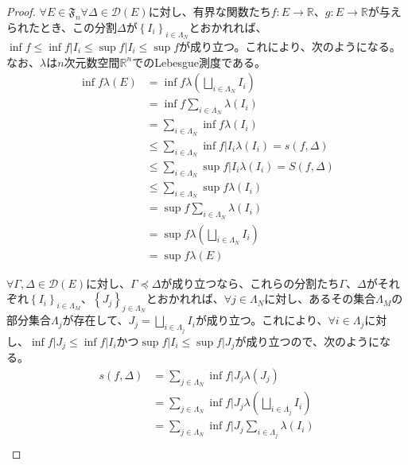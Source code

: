 \documentclass[dvipdfmx]{jsarticle}
\begin{document}
\begin{proof}
$\forall E \in \mathfrak{F}_{n}\forall\varDelta \in \mathcal{D}(E)$に対し、有界な関数たち$f:E \rightarrow \mathbb{R}$、$g:E \rightarrow \mathbb{R}$が与えられたとき、この分割$\varDelta$が$\left\{ I_{i} \right\}_{i \in \varLambda_{N}}$とおかれれば、$\inf f \leq \inf{f|I_{i}} \leq \sup{f|I_{i}} \leq \sup f$が成り立つ。これにより、次のようになる。なお、$\lambda$は$n$次元数空間$\mathbb{R}^{n}$でのLebesgue測度である。
\begin{align*}
\inf f\lambda(E) &= \inf f\lambda\left( \bigsqcup_{i \in \varLambda_{N}} I_{i} \right)\\
&= \inf f\sum_{i \in \varLambda_{N}} {\lambda\left( I_{i} \right)}\\
&= \sum_{i \in \varLambda_{N}} {\inf f\lambda\left( I_{i} \right)}\\
&\leq \sum_{i \in \varLambda_{N}} {\inf{f|I_{i}}\lambda\left( I_{i} \right)} = s(f,\varDelta)\\
&\leq \sum_{i \in \varLambda_{N}} {\sup{f|I_{i}}\lambda\left( I_{i} \right)} = S(f,\varDelta)\\
&\leq \sum_{i \in \varLambda_{N}} {\sup f\lambda\left( I_{i} \right)}\\
&= \sup f\sum_{i \in \varLambda_{N}} {\lambda\left( I_{i} \right)}\\
&= \sup f\lambda\left( \bigsqcup_{i \in \varLambda_{N}} I_{i} \right)\\
&= \sup f\lambda(E)
\end{align*}\par
$\forall\varGamma,\varDelta \in \mathcal{D}(E)$に対し、$\varGamma \preccurlyeq \varDelta$が成り立つなら、これらの分割たち$\varGamma$、$\varDelta$がそれぞれ$\left\{ I_{i} \right\}_{i \in \varLambda_{M}}$、$\left\{ J_{j} \right\}_{j \in \varLambda_{N}}$とおかれれば、$\forall j \in \varLambda_{N}$に対し、あるその集合$\varLambda_{M}$の部分集合$\varLambda_{j}$が存在して、$J_{j} = \bigsqcup_{i \in \varLambda_{j}} I_{i}$が成り立つ。これにより、$\forall i \in \varLambda_{j}$に対し、$\inf{f|J_{j}} \leq \inf{f|I_{i}}$かつ$\sup{f|I_{i}} \leq \sup{f|J_{j}}$が成り立つので、次のようになる。
\begin{align*}
s(f,\varDelta) &= \sum_{j \in \varLambda_{N}} {\inf{f|J_{j}}\lambda\left( J_{j} \right)}\\
&= \sum_{j \in \varLambda_{N}} {\inf{f|J_{j}}\lambda\left( \bigsqcup_{i \in \varLambda_{j}} I_{i} \right)}\\
&= \sum_{j \in \varLambda_{N}} {\inf{f|J_{j}}\sum_{i \in \varLambda_{j}} {\lambda\left( I_{i} \right)}}\\

\end{align*}
\end{proof}
\end{document}

